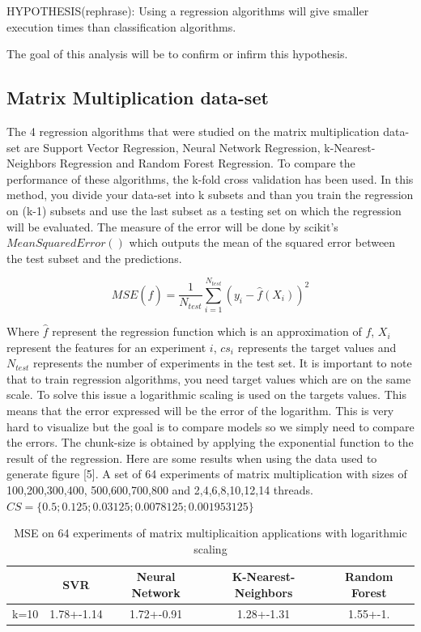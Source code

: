  HYPOTHESIS(rephrase): Using a regression algorithms will give smaller execution times than classification algorithms.
 
  The goal of this analysis will be to confirm or infirm this hypothesis.


\subsection{Matrix Multiplication data-set}

The 4 regression algorithms that were studied on the matrix multiplication data-set are Support Vector Regression, Neural Network Regression, k-Nearest-Neighbors Regression and Random Forest Regression. To compare the performance of these algorithms, the k-fold cross validation has been used. In this method, you divide your data-set into k subsets and than you train the regression on (k-1) subsets and use the last subset as a testing set on which the regression will be evaluated. The measure of the error will be done by scikit's $MeanSquaredError()$ which outputs the mean of the squared error between the test subset and the predictions.

$$MSE(\hat{f})=\frac{1}{N_{test}}\sum_{i=1}^{N_{test}}(y_i-\hat{f}(X_i))^2$$

Where $\hat{f}$ represent the regression function which is an approximation of $f$, $X_i$ represent the features for an experiment $i$, $cs_i$ represents the target values and $N_{test}$ represents the number of experiments in the test set. It is important to note that to train regression algorithms, you need target values which are on the same scale. To solve this issue a logarithmic scaling is used on the targets values. This means that the error expressed will be the error of the logarithm. This is very hard to visualize but the goal is to compare models so we simply need to compare the errors. The chunk-size is obtained by applying the exponential function to the result of the regression.
Here are some results when using the data used to generate  figure [5]. A set of 64 experiments of matrix multiplication with sizes of 100,200,300,400, 500,600,700,800 and 2,4,6,8,10,12,14 threads.$CS=\{0.5;0.125;0.03125;0.0078125;0.001953125\}$

\begin{table}[h]
	\centering
	\caption{MSE on 64 experiments of matrix multiplicaition applications with logarithmic scaling }
	\label{my-label}
	\begin{tabular}{|c|c|c|c|c|}
		\hline
		& SVR           & Neural Network & K-Nearest-Neighbors & Random Forest \\ \hline
		k=10 & 1.78+-1.14  & 1.72+-0.91    & 1.28+-1.31        & 1.55+-1. \\ \hline
	\end{tabular}
\end{table}

